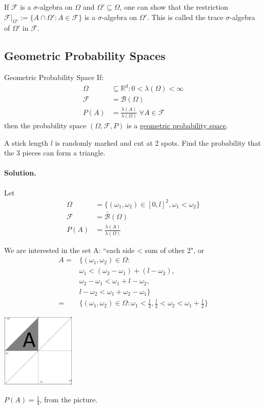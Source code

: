 \documentclass{article}
\begin{document}
	If $\mathcal{F}$ is a $\sigma$-algebra on $\Omega$ and $\Omega'\subseteq\Omega$, one can show that the restriction\\
	$\mathcal{F}|_{\Omega'}:=\{A\cap\Omega' : A\in\mathcal{F}\}$ is a $\sigma$-algebra on $\Omega'$. This is called the trace $\sigma$-algebra of $\Omega'$ in $\mathcal{F}$.
	
	\newpage\subsection{Geometric Probability Spaces}
	\begin{mydef}{Geometric Probability Space}{}
		If:
		\begin{align*}
			\Omega&\subseteq\mathbb{R}^d : 0<\lambda(\Omega)<\infty\\
			\mathcal{F}&=\mathcal{B}(\Omega) \\
			P(A)&=\frac{\lambda(A)}{\lambda(\Omega)}\;\forall A\in\mathcal{F}
		\end{align*}
		then the probability space $(\Omega, \mathcal{F}, P)$ is a \underline{geometric probability space}.
	\end{mydef}
	
	\begin{myex}{}{}
		A stick length $l$ is randomly marked and cut at 2 spots. Find the probability that the 3 pieces can form a triangle.
		
		\paragraph{Solution.}
		Let
		\begin{align*}
			\Omega&=\{(\omega_1, \omega_2)\in[0, l]^2, \omega_1<\omega_2\}\\
			\mathcal{F}&=\bar{\mathcal{B}}(\Omega)\\
			P(A)&=\frac{\lambda(A)}{\lambda(\Omega)}
		\end{align*}
		
		We are interested in the set A: ``each side \textless\; sum of other 2", or
		\begin{align*}
			A=&\{(\omega_1, \omega_2)\in\Omega :\\
			&\omega_1<(\omega_2-\omega_1)+(l-\omega_2),\\
			&\omega_2-\omega_1<\omega_1+l-\omega_2,\\
			&l-\omega_2<\omega_1+\omega_2-\omega_1\}\\
			=&\{(\omega_1, \omega_2)\in\Omega : \omega_1<\frac{l}{2}, \frac{l}{2}<\omega_2<\omega_1+\frac{l}{2}\}
		\end{align*}
		
		\includegraphics[width=100pt]{triangle.png}
		
		$P(A)=\frac{1}{4}$, from the picture.
	\end{myex}
	
\end{document}
